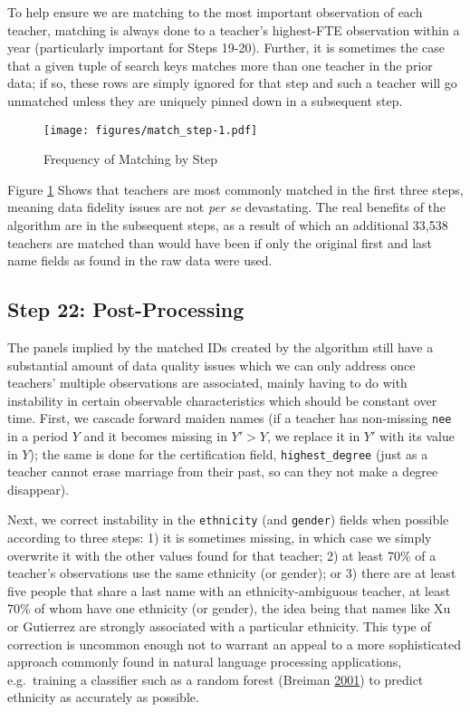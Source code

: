 \documentclass[12pt,]{article}
\begin{document}
To help ensure we are matching to the most important observation of each
teacher, matching is always done to a teacher's highest-FTE observation
within a year (particularly important for Steps 19-20). Further, it is
sometimes the case that a given tuple of search keys matches more than
one teacher in the prior data; if so, these rows are simply ignored for
that step and such a teacher will go unmatched unless they are uniquely
pinned down in a subsequent step.

\begin{figure}[htbp]
\centering
\texttt{[image: figures/match\_step-1.pdf]}
\caption{\label{fig:step}Frequency of Matching by Step}
\end{figure}

Figure \ref{fig:step} Shows that teachers are most commonly matched in
the first three steps, meaning data fidelity issues are not \emph{per
se} devastating. The real benefits of the algorithm are in the
subsequent steps, as a result of which an additional 33,538 teachers are
matched than would have been if only the original first and last name
fields as found in the raw data were used.

\subsection{Step 22: Post-Processing}\label{step-22-post-processing}

The panels implied by the matched IDs created by the algorithm still
have a substantial amount of data quality issues which we can only
address once teachers' multiple observations are associated, mainly
having to do with instability in certain observable characteristics
which should be constant over time. First, we cascade forward maiden
names (if a teacher has non-missing \texttt{nee} in a period \(Y\) and
it becomes missing in \(Y'>Y\), we replace it in \(Y'\) with its value
in \(Y\)); the same is done for the certification field,
\texttt{highest\_degree} (just as a teacher cannot erase marriage from
their past, so can they not make a degree disappear).

Next, we correct instability in the \texttt{ethnicity} (and
\texttt{gender}) fields when possible according to three steps: 1) it is
sometimes missing, in which case we simply overwrite it with the other
values found for that teacher; 2) at least 70\% of a teacher's
observations use the same ethnicity (or gender); or 3) there are at
least five people that share a last name with an ethnicity-ambiguous
teacher, at least 70\% of whom have one ethnicity (or gender), the idea
being that names like Xu or Gutierrez are strongly associated with a
particular ethnicity. This type of correction is uncommon enough not to
warrant an appeal to a more sophisticated approach commonly found in
natural language processing applications, e.g.~training a classifier
such as a random forest (Breiman \protect\hyperlink{ref-breiman}{2001})
to predict ethnicity as accurately as possible.
\end{document}
